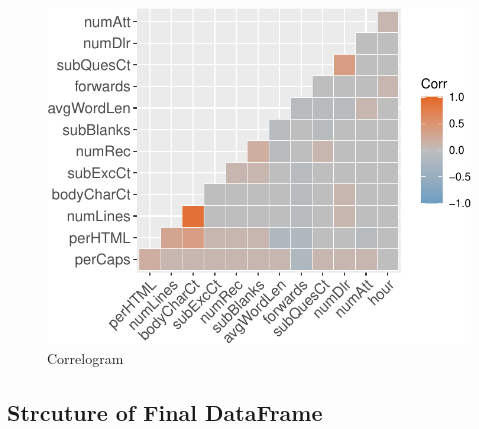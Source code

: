 \documentclass[
]{article}
\begin{document}
\begin{figure}[H]

{\centering \includegraphics{case_study03_files/figure-latex/unnamed-chunk-14-1} 

}

\caption{Correlogram}\label{fig:unnamed-chunk-14}
\end{figure}

\hypertarget{strcuture-of-final-dataframe}{%
\subsection{Strcuture of Final
DataFrame}\label{strcuture-of-final-dataframe}}
\end{document}
